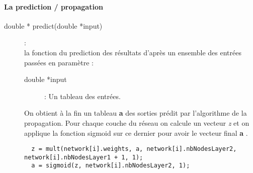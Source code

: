 \paragraph{La prediction / propagation }
\begin{description}
\item[{double * predict(double *input)}]:\\ la fonction du prediction des résultats d'après un ensemble des entrées passées en paramètre :
	\begin{description}
        \item[double *input] : Un tableau des entrées.
	\end{description}
On obtient à la fin un tableau \textbf{a} des sorties prédit par l'algorithme de la propagation.
	Pour chaque couche du réseau on calcule un vecteur \textit{z} et on applique la fonction sigmoid sur ce dernier pour avoir le vecteur final \textbf{a} .
\begin{verbatim}
  z = mult(network[i].weights, a, network[i].nbNodesLayer2, network[i].nbNodesLayer1 + 1, 1);
  a = sigmoid(z, network[i].nbNodesLayer2, 1);
\end{verbatim}
\end{description}

